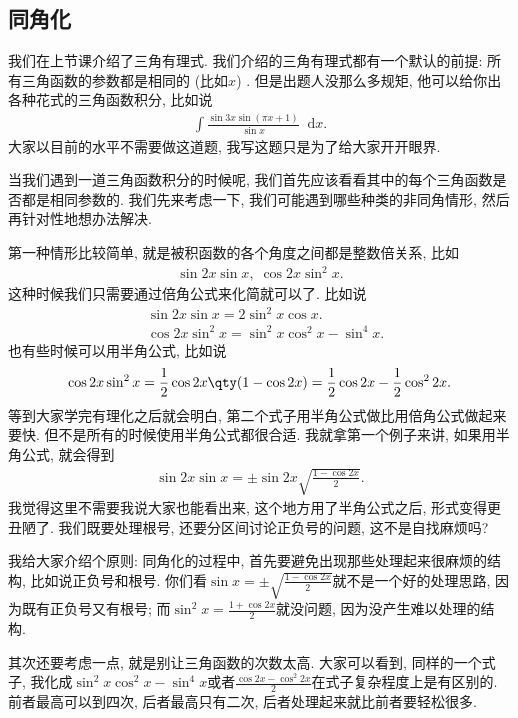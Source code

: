 \documentclass{ctexbook}
\newcommand*{\dif}{\mathop{}\!\mathrm{d}}
\begin{document}
{\subsection{同角化}
我们在上节课介绍了三角有理式. 我们介绍的三角有理式都有一个默认的前提: 所有三角函数的参数都是相同的 (比如$x$) . 但是出题人没那么多规矩, 他可以给你出各种花式的三角函数积分, 比如说
\begin{align*}
\int\frac{\sin{3x}\sin(\pi x+1)}{\sin{x}}\dif{x}
.\end{align*}
大家以目前的水平不需要做这道题, 我写这题只是为了给大家开开眼界. \par
当我们遇到一道三角函数积分的时候呢, 我们首先应该看看其中的每个三角函数是否都是相同参数的. 我们先来考虑一下, 我们可能遇到哪些种类的非同角情形, 然后再针对性地想办法解决. \par
第一种情形比较简单, 就是被积函数的各个角度之间都是整数倍关系, 比如
\begin{align*}
\sin{2x}\sin{x},\;\cos{2x}\sin^{2}{x}
.\end{align*}
这种时候我们只需要通过倍角公式来化简就可以了. 比如说
\begin{align*}
{}&\sin{2x}\sin{x}=2\sin^{2}{x}\cos{x}.\\
{}&\cos{2x}\sin^{2}{x}=\sin^{2}{x}\cos^{2}{x}-\sin^{4}{x}
.\end{align*}
也有些时候可以用半角公式, 比如说
\begin{align*}
\cos{2x}\sin^{2}{x}=\frac{1}{2}\cos{2x}\qty(1-\cos{2x})=\frac{1}{2}\cos{2x}-\frac{1}{2}\cos^{2}{2x}
.\end{align*}
等到大家学完有理化之后就会明白, 第二个式子用半角公式做比用倍角公式做起来要快. 但不是所有的时候使用半角公式都很合适. 我就拿第一个例子来讲, 如果用半角公式, 就会得到
\begin{align*}
\sin{2x}\sin{x}=\pm\sin{2x}\sqrt{\frac{1-\cos{2x}}{2}}
.\end{align*}
我觉得这里不需要我说大家也能看出来, 这个地方用了半角公式之后, 形式变得更丑陋了. 我们既要处理根号, 还要分区间讨论正负号的问题, 这不是自找麻烦吗? \par
我给大家介绍个原则: 同角化的过程中, 首先要避免出现那些处理起来很麻烦的结构, 比如说正负号和根号. 你们看$\sin{x}=\pm\sqrt{\frac{1-\cos{2x}}{2}}$就不是一个好的处理思路, 因为既有正负号又有根号; 而$\sin^{2}{x}=\frac{1+\cos{2x}}{2}$就没问题, 因为没产生难以处理的结构. \par
其次还要考虑一点, 就是别让三角函数的次数太高. 大家可以看到, 同样的一个式子, 我化成$\sin^{2}{x}\cos^{2}{x}-\sin^{4}{x}$或者$\frac{\cos{2x}-\cos^{2}{2x}}{2}$在式子复杂程度上是有区别的. 前者最高可以到四次, 后者最高只有二次, 后者处理起来就比前者要轻松很多. \par
}
\end{document}
